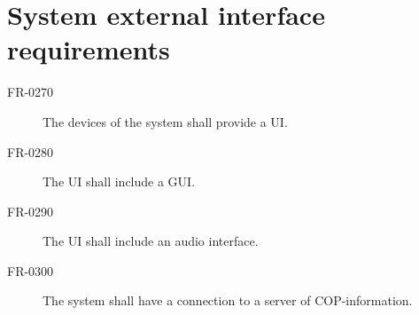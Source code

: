 \section{System external interface requirements}

\begin{description}
  \item[FR-0270] The devices of the system shall provide a UI. %
  \item[FR-0280] The UI shall include a GUI.
  \item[FR-0290] The UI shall include an audio interface.
  \item[FR-0300] The system shall have a connection to a server of COP-information.  


\end{description}
